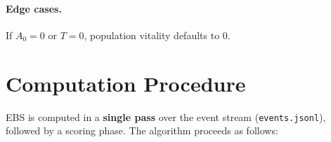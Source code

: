 \documentclass[a4paper, 11pt]{article}
\begin{document}
\paragraph{Edge cases.} If $A_0 = 0$ or $T = 0$, population vitality defaults to $0$.

\section{Computation Procedure}
\label{sec:computation}

EBS is computed in a \textbf{single pass} over the event stream (\texttt{events.jsonl}), followed by a scoring phase. The algorithm proceeds as follows:
\end{document}
